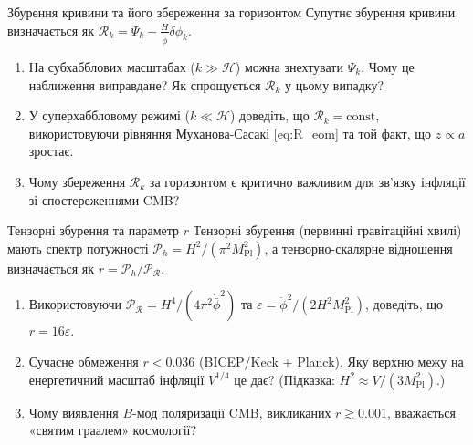 
\begin{problem}{Збурення кривини та його збереження за горизонтом}
Супутнє збурення кривини визначається як $\mathcal{R}_k = \Psi_k - \frac{H}{\dot{\bar\phi}}\delta\phi_k$.

\begin{enumerate}
    \item На субхабблових масштабах ($k \gg \mathcal{H}$) можна знехтувати $\Psi_k$.
          Чому це наближення виправдане? Як спрощується $\mathcal{R}_k$ у цьому випадку?
    \item У суперхаббловому режимі ($k \ll \mathcal{H}$) доведіть, що $\mathcal{R}_k = \mathrm{const}$,
          використовуючи рівняння Муханова-Сасакі \eqref{eq:R_eom} та той факт, що $z \propto a$ зростає.
    \item Чому збереження $\mathcal{R}_k$ за горизонтом є критично важливим для
          зв'язку інфляції зі спостереженнями CMB?
\end{enumerate}
\end{problem}


\begin{problem}{Тензорні збурення та параметр $r$}
Тензорні збурення (первинні гравітаційні хвилі) мають спектр потужності
$\mathcal{P}_h = H^2/(\pi^2 M_{\mathrm{Pl}}^2)$, а тензорно-скалярне відношення
визначається як $r = \mathcal{P}_h / \mathcal{P}_{\mathcal{R}}$.

\begin{enumerate}
    \item Використовуючи $\mathcal{P}_{\mathcal{R}} = H^4/(4\pi^2\dot{\bar\phi}^2)$ та
          $\varepsilon = \dot{\phi}^2/(2H^2 M_{\mathrm{Pl}}^2)$, доведіть, що $r = 16\varepsilon$.
    \item Сучасне обмеження $r < 0.036$ (BICEP/Keck + Planck). Яку верхню межу
          на енергетичний масштаб інфляції $V^{1/4}$ це дає? (Підказка: $H^2 \approx V/(3M_{\mathrm{Pl}}^2)$.)
    \item Чому виявлення $B$-мод поляризації CMB, викликаних $r \gtrsim 0.001$,
          вважається «святим граалем» космології?
\end{enumerate}
\end{problem}


